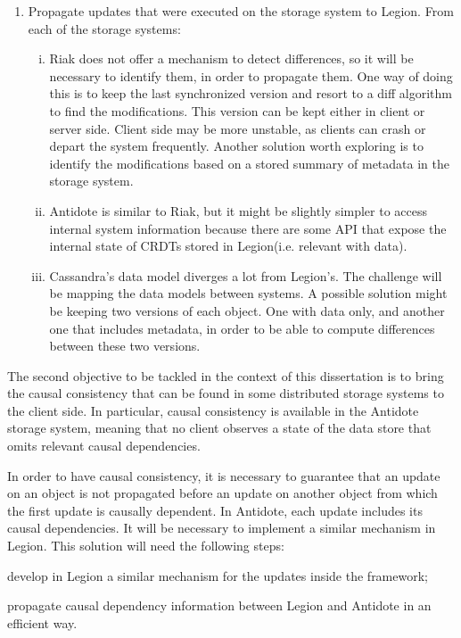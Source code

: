 \begin{itemize}
\begin{enumerate}
	\item Propagate updates that were executed on the storage system to Legion. From each of the storage systems:
	\begin{enumerate}[(i)]
		\item Riak does not offer a mechanism to detect differences, so it will be necessary to identify them, in order to propagate them. One way of doing this is to keep the last synchronized version and resort to a diff algorithm to find the modifications. This version can be kept either in client or server side. Client side may be more unstable, as clients can crash or depart the system frequently. Another solution worth exploring is to identify the modifications based on a stored summary of metadata in the storage system.
		
		\item Antidote is similar to Riak, but it might be slightly simpler to access internal system information because there are some API that expose the internal state of CRDTs stored in Legion(i.e. relevant with data).
		
		\item Cassandra's data model diverges a lot from Legion's. The challenge will be mapping the data models between systems. A possible solution might be keeping two versions of each object. One with data only, and another one that includes metadata, in order to be able to compute differences between these two versions.
	\end{enumerate}
	
	\end{enumerate}

\end{itemize}

The second objective to be tackled in the context of this dissertation is to bring the causal consistency that can be found in some distributed storage systems to the client side. In particular, causal consistency is available in the Antidote storage system, meaning that no client observes a state of the data store that omits relevant causal dependencies.\par
	In order to have causal consistency, it is necessary to guarantee that an update on an object is not propagated before an update on another object from which the first update is causally dependent. In Antidote, each update includes its causal dependencies. It will be necessary to implement a similar mechanism in Legion. This solution will need the following steps: \begin{enumerate*}[(i)]
	\item develop in Legion a similar mechanism for the updates inside the framework;
	\item propagate causal dependency information between Legion and Antidote in an efficient way.
	\end{enumerate*}

